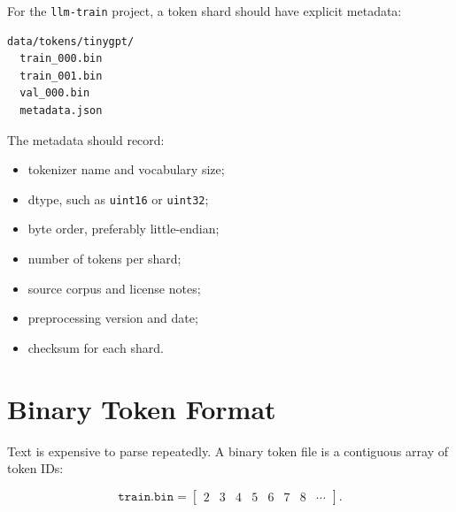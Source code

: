 For the \texttt{llm-train} project, a token shard should have explicit metadata:

\begin{lstlisting}
data/tokens/tinygpt/
  train_000.bin
  train_001.bin
  val_000.bin
  metadata.json
\end{lstlisting}

The metadata should record:

\begin{itemize}
  \item tokenizer name and vocabulary size;
  \item dtype, such as \texttt{uint16} or \texttt{uint32};
  \item byte order, preferably little-endian;
  \item number of tokens per shard;
  \item source corpus and license notes;
  \item preprocessing version and date;
  \item checksum for each shard.
\end{itemize}

\section{Binary Token Format}

Text is expensive to parse repeatedly. A binary token file is a contiguous array of token IDs:

\[
\texttt{train.bin} =
\begin{bmatrix}
2&3&4&5&6&7&8&\cdots
\end{bmatrix}.
\]

\begin{center}
\end{center}

